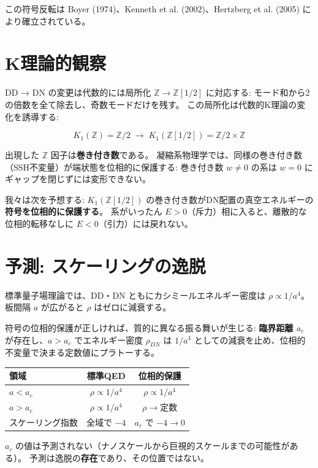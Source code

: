 \documentclass[11pt,a4paper]{article}
\begin{document}
この符号反転は Boyer (1974)、Kenneth et al. (2002)、Hertzberg et al. (2005) により確立されている。

\section{K理論的観察}

DD → DN の変更は代数的には局所化 $\mathbb{Z} \to \mathbb{Z}[1/2]$ に対応する:
モード和から2の倍数を全て除去し、奇数モードだけを残す。
この局所化は代数的K理論の変化を誘導する:

$$K_1(\mathbb{Z}) = \mathbb{Z}/2 \;\longrightarrow\; K_1(\mathbb{Z}[1/2]) = \mathbb{Z}/2 \times \mathbb{Z}$$

出現した $\mathbb{Z}$ 因子は\textbf{巻き付き数}である。
凝縮系物理学では、同様の巻き付き数（SSH不変量）が端状態を位相的に保護する:
巻き付き数 $w \neq 0$ の系は $w = 0$ にギャップを閉じずには変形できない。

我々は次を予想する: $K_1(\mathbb{Z}[1/2])$ の巻き付き数がDN配置の真空エネルギーの\textbf{符号を位相的に保護する}。
系がいったん $E > 0$（斥力）相に入ると、離散的な位相的転移なしに $E < 0$（引力）には戻れない。

\section{予測: スケーリングの逸脱}

標準量子場理論では、DD・DN ともにカシミールエネルギー密度は $\rho \propto 1/a^4$。
板間隔 $a$ が広がると $\rho$ はゼロに減衰する。

符号の位相的保護が正しければ、質的に異なる振る舞いが生じる:
\textbf{臨界距離 $a_c$} が存在し、$a > a_c$ でエネルギー密度 $\rho_{DN}$ は $1/a^4$ としての減衰を止め、位相的不変量で決まる定数値にプラトーする。

\begin{center}
\begin{tabular}{lcc}
\toprule
領域 & 標準QED & 位相的保護 \\
\midrule
$a < a_c$ & $\rho \propto 1/a^4$ & $\rho \propto 1/a^4$ \\
$a > a_c$ & $\rho \propto 1/a^4$ & $\rho \to \text{定数}$ \\
\midrule
スケーリング指数 & 全域で $-4$ & $a_c$ で $-4 \to 0$ \\
\bottomrule
\end{tabular}
\end{center}

$a_c$ の値は予測されない（ナノスケールから巨視的スケールまでの可能性がある）。
予測は逸脱の\textbf{存在}であり、その位置ではない。
\end{document}
